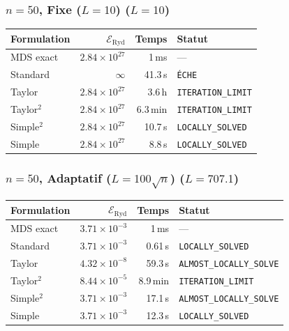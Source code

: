 \subsubsection{$n=50$, Fixe ($L{=}10$) ($L=10$)}
\begin{longtable}{@{}lrrl@{}}
  \toprule
  Formulation & $\mathcal{E}_{\mathrm{Ryd}}$ & Temps & Statut \\
  \midrule
  \endhead
  MDS exact & $2.84\times10^{27}$ & 1\,ms & --- \\
  Standard & $\infty$ & 41.3\,s & \texttt{ÉCHE} \\
  Taylor & $2.84\times10^{27}$ & 3.6\,h & \texttt{ITERATION\_LIMIT} \\
  Taylor$^2$ & $2.84\times10^{27}$ & 6.3\,min & \texttt{ITERATION\_LIMIT} \\
  Simple$^2$ & $2.84\times10^{27}$ & 10.7\,s & \texttt{LOCALLY\_SOLVED} \\
  Simple & $2.84\times10^{27}$ & 8.8\,s & \texttt{LOCALLY\_SOLVED} \\
  \bottomrule
\end{longtable}

\subsubsection{$n=50$, Adaptatif ($L{=}100\sqrt{n}$) ($L=707.1$)}
\begin{longtable}{@{}lrrl@{}}
  \toprule
  Formulation & $\mathcal{E}_{\mathrm{Ryd}}$ & Temps & Statut \\
  \midrule
  \endhead
  MDS exact & $3.71\times10^{-3}$ & 1\,ms & --- \\
  Standard & $3.71\times10^{-3}$ & 0.61\,s & \texttt{LOCALLY\_SOLVED} \\
  Taylor & $4.32\times10^{-8}$ & 59.3\,s & \texttt{ALMOST\_LOCALLY\_SOLVE} \\
  Taylor$^2$ & $8.44\times10^{-5}$ & 8.9\,min & \texttt{ITERATION\_LIMIT} \\
  Simple$^2$ & $3.71\times10^{-3}$ & 17.1\,s & \texttt{ALMOST\_LOCALLY\_SOLVE} \\
  Simple & $3.71\times10^{-3}$ & 12.3\,s & \texttt{LOCALLY\_SOLVED} \\
  \bottomrule
\end{longtable}

